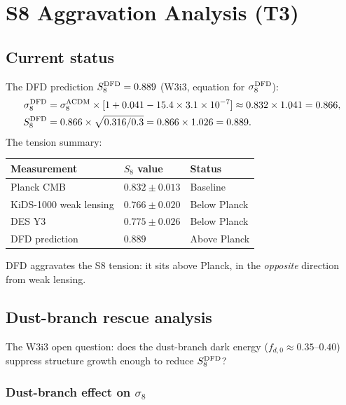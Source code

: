 \documentclass[11pt]{article}
\newcommand{\ee}[1]{\times 10^{#1}}
\newcommand{\DFD}{{\rm DFD}}
\newcommand{\LCDM}{\Lambda{\rm CDM}}
\begin{document}
\section{S8 Aggravation Analysis (T3)}
\label{sec:s8-aggravation}

\subsection{Current status}

The DFD prediction $S_8^{\DFD} = 0.889$ (W3i3, equation for $\sigma_8^{\DFD}$):
\begin{align}
  \sigma_8^{\DFD} &= \sigma_8^{\LCDM}\times[1 + 0.041 - 15.4\times 3.1\ee{-7}]
  \approx 0.832\times 1.041 = 0.866, \\
  S_8^{\DFD} &= 0.866\times\sqrt{0.316/0.3} = 0.866\times 1.026 = 0.889.
\end{align}
The tension summary:
\begin{center}
\begin{tabular}{lll}
\toprule
Measurement & $S_8$ value & Status \\
\midrule
Planck CMB & $0.832 \pm 0.013$ & Baseline \\
KiDS-1000 weak lensing & $0.766 \pm 0.020$ & Below Planck \\
DES Y3 & $0.775 \pm 0.026$ & Below Planck \\
DFD prediction & $0.889$ & Above Planck \\
\bottomrule
\end{tabular}
\end{center}
DFD aggravates the S8 tension: it sits above Planck, in the \emph{opposite}
direction from weak lensing.

\subsection{Dust-branch rescue analysis}

The W3i3 open question: does the dust-branch dark energy ($f_{d,0} \approx
0.35$--$0.40$) suppress structure growth enough to reduce $S_8^{\DFD}$?

\subsubsection{Dust-branch effect on $\sigma_8$}
\end{document}
